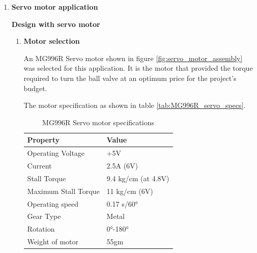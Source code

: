 \begin{enumerate}
    
    \item \textbf{Servo motor application}\\
    \par
    \textbf{Design with servo motor}
    \begin{enumerate}
    \par
    \item \textbf{Motor selection}
    \par
    An MG996R Servo motor shown in figure \ref{fig:servo_motor_assembly} was selected for this application. It is the motor that provided the torque required to turn the ball valve at an optimum price for the project's budget. 
    \par
    The motor specification as shown in table \ref{tab:MG996R_servo_specs}.
    \begin{table}[H]
    \centering
    \caption[MG996R Servo motor specifications]{MG996R Servo motor specifications \cite{mg996r}}
    \begin{tabular}{|l|l|}
    \hline
    \textbf{Property} & \textbf{Value} \\ \hline
    Operating Voltage & +5V \\ \hline
    Current & 2.5A (6V) \\ \hline
    Stall Torque & 9.4 kg/cm (at 4.8V) \\ \hline
    Maximum Stall Torque & 11 kg/cm (6V) \\ \hline
    Operating speed & 0.17 s/60° \\ \hline
    Gear Type & Metal \\ \hline
    Rotation & 0°-180° \\ \hline
    Weight of motor & 55gm \\ \hline

\end{tabular}
\end{table}
\end{enumerate}
\end{enumerate}

